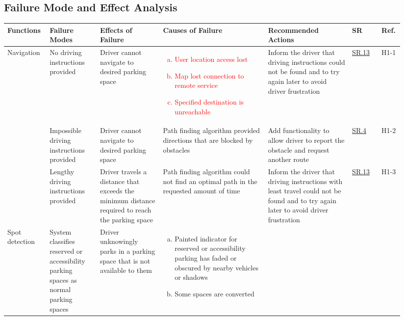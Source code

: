 \documentclass[12pt,letterpaper]{article}
\begin{document}
\begin{landscape}
\begin{table}[hp]
\section{Failure Mode and Effect Analysis}

\begin{tabular}{|p{0.09\linewidth}|p{0.12\linewidth}|p{0.15\linewidth}|p{0.25\linewidth}|p{0.2\linewidth}|p{0.075\linewidth}|p{0.05\linewidth}|}
\hline
Functions & Failure Modes & Effects of Failure & Causes of Failure & Recommended
Actions & SR & Ref.\\
\hline
Navigation & No driving instructions provided & Driver cannot navigate to
desired parking space & \textcolor{red}{\begin{enumerate}[a., leftmargin=0.5cm,
noitemsep,nolistsep] \item User location access lost \item Map lost connection
to remote service \item Specified destination is unreachable \end{enumerate}} &
Inform the driver that driving instructions could not be found and to try again
later to avoid driver frustration & \hyperref[isr13]{SR.13} & H1-1\\\cline{2-7}
& Impossible driving instructions provided & Driver cannot navigate to desired
parking space & Path finding algorithm provided directions that are blocked by
obstacles & Add functionality to allow driver to report the obstacle and request
another route &  \hyperref[isr4]{SR.4} & H1-2\\\cline{2-7} & Lengthy driving
instructions provided & Driver travels a distance that exceeds the minimum
distance required to reach the parking space & Path finding algorithm could not
find an optimal path in the requested amount of time & Inform the driver that
driving instructions with least travel could not be found and to try again later
to avoid driver frustration & \hyperref[isr13]{SR.13} & H1-3\\
\hline
Spot detection & System classifies reserved or accessibility parking spaces as
normal parking spaces & Driver unknowingly parks in a parking space that is not
available to them & \begin{enumerate}[a., leftmargin=0.5cm, noitemsep,
nolistsep]\item Painted indicator for reserved or accessibility parking has
faded or obscured by nearby vehicles or shadows \item Some spaces are converted

\end{enumerate}
\end{tabular}
\end{table}
\end{landscape}
\end{document}
